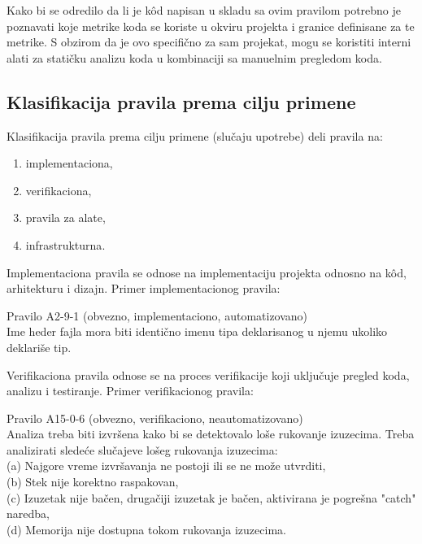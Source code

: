 \documentclass[12pt,oneside]{memoir}
\begin{document}

  Kako bi se odredilo da li je k\^{o}d napisan u skladu sa ovim pravilom potrebno je poznavati koje metrike koda se koriste u okviru projekta i
  granice definisane za te metrike. S obzirom da je ovo specifično za sam projekat, mogu se koristiti interni alati za statičku analizu koda u kombinaciji
  sa manuelnim pregledom koda. 

\subsection{Klasifikacija pravila prema cilju primene}
Klasifikacija pravila prema cilju primene (slučaju upotrebe) deli pravila na:

\begin{enumerate}
  \item{implementaciona},
  \item{verifikaciona},
  \item{pravila za alate},
  \item{infrastrukturna}.
\end{enumerate}

Implementaciona pravila se odnose na implementaciju projekta odnosno na k\^{o}d, arhitekturu i dizajn.
Primer implementacionog pravila:

\begin{center}
\begin{tcolorbox}
Pravilo A2-9-1 (obvezno, implementaciono, automatizovano) \\
Ime heder fajla mora biti identično imenu tipa deklarisanog u njemu ukoliko deklariše tip.
\end{tcolorbox}
\end{center}


Verifikaciona pravila odnose se na proces verifikacije koji uključuje pregled koda, analizu i testiranje.
Primer verifikacionog pravila:

\begin{center}
\begin{tcolorbox}
Pravilo A15-0-6 (obvezno, verifikaciono, neautomatizovano) \\
Analiza treba biti izvršena kako bi se detektovalo loše rukovanje izuzecima. Treba analizirati slede\'ce slučajeve lošeg rukovanja izuzecima: \\
(a) Najgore vreme izvršavanja ne postoji ili se ne može utvrditi, \\
(b) Stek nije korektno raspakovan, \\
(c) Izuzetak nije bačen, drugačiji izuzetak je bačen, aktivirana je pogre\v{s}na "catch" naredba, \\
(d) Memorija nije dostupna tokom rukovanja izuzecima.
\end{tcolorbox}
\end{center}
\end{document}
